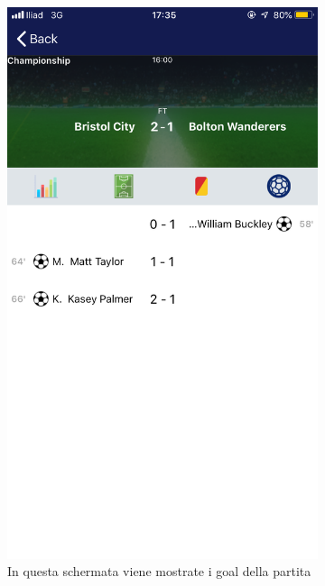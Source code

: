 \documentclass[numbers=noenddot, 12pt, a4paper, oneside]{scrbook}
\begin{document}
\begin{figure}[H]
	\begin{subfigure}{.5\textwidth}
		\centering
		\includegraphics[width=.8\linewidth]{images/Screen/Goal}
		\caption{In questa schermata viene mostrate i goal della partita}
	\end{subfigure}
	\begin{subfigure}{.5\textwidth}
		\centering

\end{subfigure}
\end{figure}
\end{document}

